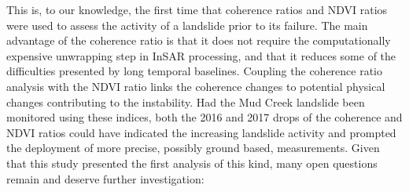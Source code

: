 \documentclass[nhess, manuscript]{copernicus}
\begin{document}
This is, to our knowledge, the first time that coherence ratios and NDVI ratios were used to assess the activity of a landslide prior to its failure. The main advantage of the coherence ratio is that it does not require the computationally expensive unwrapping step in InSAR processing, and that it reduces some of the difficulties presented by long temporal baselines. Coupling the coherence ratio analysis with the NDVI ratio links the coherence changes to potential physical changes contributing to the instability. Had the Mud Creek landslide been monitored using these indices, both the 2016 and 2017 drops of the coherence and NDVI ratios could have indicated the increasing landslide activity and prompted the deployment of more precise, possibly ground based, measurements. Given that this study presented the first analysis of this kind, many open questions remain and deserve further investigation:
\end{document}
